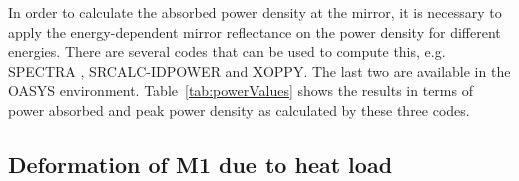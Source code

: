 \documentclass{iucr}
\begin{document}
In order to calculate the absorbed power density at the mirror, it is necessary to apply the energy-dependent mirror reflectance on the power density for different energies. There are several codes that can be used to compute this, e.g. SPECTRA \cite{codeSPECTRA}, SRCALC-IDPOWER \cite{SRCALC} and XOPPY. The last two are available in the OASYS environment. Table~\ref{tab:powerValues} shows the results in terms of power absorbed and peak power density as calculated by these three codes. 

\begin{table}\label{tab:powerValues}
    \caption{Absorbed power by the mirror M1 for two apertures with mirror illuminated areas of 460 $\times$ 10 mm$^2$ and 100 $\times$ 24 mm$&^2$  (6$\sigma$) as calculated by different codes.
    }
\end{table}

\subsection{Deformation of M1 due to heat load}
\end{document}
